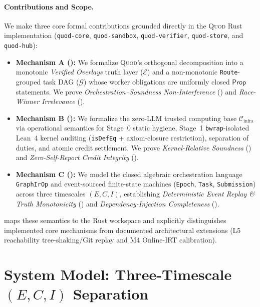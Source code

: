 \documentclass[sigplan,nonacm,10pt]{acmart}
\newcommand{\Cinfra}{\mathcal{C}_{\mathrm{infra}}}
\newcommand{\Truth}{\mathcal{E}}
\newcommand{\Orch}{\mathcal{G}}
\newcommand{\Prop}{\mathsf{Prop}}
\newcommand{\code}[1]{\texttt{#1}}
\begin{document}
\paragraph{Contributions and Scope.}
We make three core formal contributions grounded directly in the \textsc{Quod} Rust implementation (\code{quod-core}, \code{quod-sandbox}, \code{quod-verifier}, \code{quod-store}, and \code{quod-hub}):
\begin{itemize}
  \item \textbf{Mechanism A ():} We formalize \textsc{Quod}'s orthogonal decomposition into a monotonic \emph{Verified Overlays} truth layer ($\Truth$) and a non-monotonic \code{Route}-grouped task DAG ($\Orch$) whose worker obligations are uniformly closed $\Prop$ statements. We prove \emph{Orchestration--Soundness Non-Interference} () and \emph{Race-Winner Irrelevance} ().
  \item \textbf{Mechanism B ():} We formalize the zero-LLM trusted computing base $\Cinfra$ via operational semantics for Stage~0 static hygiene, Stage~1 \code{bwrap}-isolated Lean~4 kernel auditing (\code{isDefEq} + axiom-closure restriction), separation of duties, and atomic credit settlement. We prove \emph{Kernel-Relative Soundness} () and \emph{Zero-Self-Report Credit Integrity} ().
  \item \textbf{Mechanism C ():} We model the closed algebraic orchestration language \code{GraphIrOp} and event-sourced finite-state machines (\code{Epoch}, \code{Task}, \code{Submission}) across three timescales $(E,C,I)$, establishing \emph{Deterministic Event Replay \& Truth Monotonicity} () and \emph{Dependency-Injection Completeness} ().
\end{itemize}
 maps these semantics to the Rust workspace and explicitly distinguishes implemented core mechanisms from documented architectural extensions (L5 reachability tree-shaking/Git replay and M4 Online-IRT calibration).

\section{System Model: Three-Timescale $(E, C, I)$ Separation}\label{sec:model}
\end{document}
